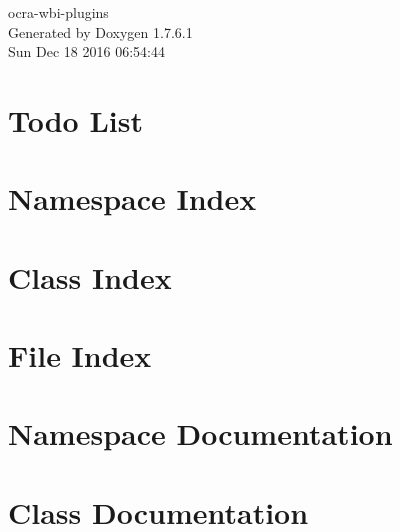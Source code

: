 \documentclass[a4paper]{book}
\begin{document}
\hypersetup{pageanchor=false,citecolor=blue}
\begin{titlepage}
\vspace*{7cm}
\begin{center}
{\Large ocra-\/wbi-\/plugins }\\
\vspace*{1cm}
{\large \-Generated by Doxygen 1.7.6.1}\\
\vspace*{0.5cm}
{\small Sun Dec 18 2016 06:54:44}\\
\end{center}
\end{titlepage}
\clearemptydoublepage
{}
\tableofcontents
\clearemptydoublepage
{}
\hypersetup{pageanchor=true,citecolor=blue}
\chapter{\-Todo \-List}
\label{todo}
\hypertarget{todo}{}

\chapter{\-Namespace \-Index}

\chapter{\-Class \-Index}

\chapter{\-File \-Index}

\chapter{\-Namespace \-Documentation}

\chapter{\-Class \-Documentation}





















\end{document}
